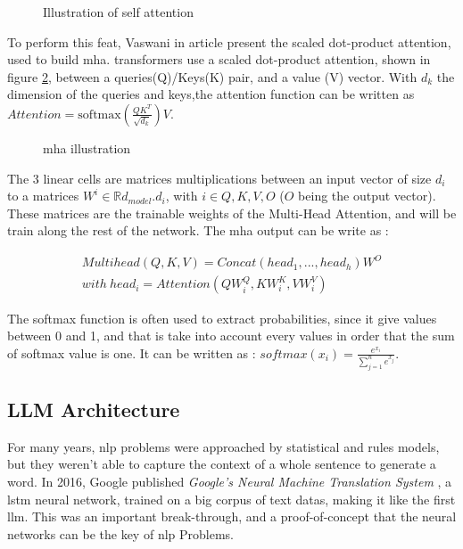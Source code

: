 \begin{figure}
    \centering
    
    \caption{Illustration of self attention}
    \label{fig:self_att}
\end{figure}


To perform this feat, Vaswani in article \cite{vaswani_attention_2017} present the scaled dot-product attention, used to build \acrshort{mha}. \Glspl{transformer} use a scaled dot-product attention, shown in figure \ref{fig:mha}, between a queries(Q)/Keys(K) pair, and a value (V) vector. With $d_k$ the dimension of the queries and keys,the attention function can be written as $Attention = \text{softmax} ( \frac{Q K^T}{\sqrt{d_k}})V$.

\begin{figure}
    \centering
    
    \caption{\acrfull{mha} illustration }
    \label{fig:mha}
\end{figure}

The 3 linear cells are matrices multiplications between an input vector of size $d_i$ to a matrices $W^i \in \mathbb{R}{d_{model} . d_i}$, with $i \in {Q,K,V,O}$ ($O$ being the output vector). These matrices are the trainable weights of the Multi-Head Attention, and will be train along the rest of the network. The \acrshort{mha} output can be write as : 

\begin{equation}
\begin{split}
 Multihead (Q,K,V) = Concat (head_1,...,head_h)W^O\\
with \ head_i = Attention (Q W_i^Q,K W_i^K,V W_i^V)
\end{split}
\label{eq : MHA}  
\end{equation}

The softmax function is often used to extract probabilities, since it give values between 0 and 1, and that is take into account every values in order that the sum of softmax value is one. It can be written as : $\displaystyle
softmax(x_i) = \frac{e^{x_i}}{\sum_{j=1}^n e^{x_j}}$.


\subsection{LLM Architecture}
\label{sec:llm_arch}
For many years, \acrshort{nlp} problems were approached by statistical and rules models, but they weren't able to capture the context of a whole sentence to generate a word. In 2016, Google published \textit{Google's Neural Machine Translation System} \cite{Google_translation_2016}, a \acrfull{lstm} neural network, trained on a big corpus of text datas, making it like the first \acrlong{llm}. This was an important break-through, and a proof-of-concept that the neural networks can be the key of \acrshort{nlp} Problems.

